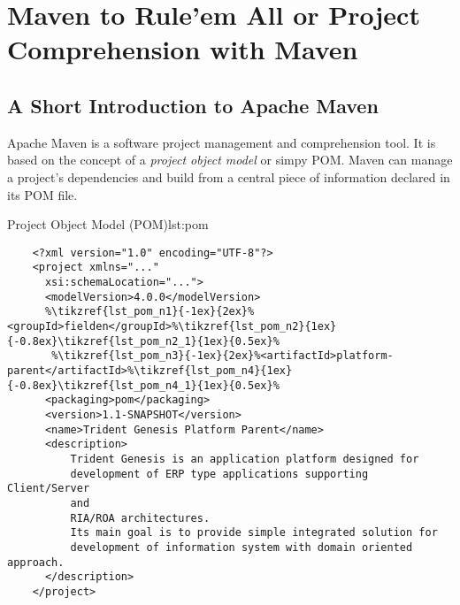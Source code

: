 \chapter{Maven to Rule'em All or Project Comprehension with Maven}\label{ch00:01}

\section{A Short Introduction to Apache Maven}
  
  Apache Maven is a software project management and comprehension tool. 
  It is based on the concept of a \emph{project object model} or simpy POM. 
  Maven can manage a project's dependencies and build from a central piece of information declared in its POM file.

  \begin{code}{Project Object Model (POM)}{lst:pom}
    \begin{lstlisting}
    <?xml version="1.0" encoding="UTF-8"?>
    <project xmlns="..."
	  xsi:schemaLocation="...">
	  <modelVersion>4.0.0</modelVersion>
	  %\tikzref{lst_pom_n1}{-1ex}{2ex}%<groupId>fielden</groupId>%\tikzref{lst_pom_n2}{1ex}{-0.8ex}\tikzref{lst_pom_n2_1}{1ex}{0.5ex}%
	   %\tikzref{lst_pom_n3}{-1ex}{2ex}%<artifactId>platform-parent</artifactId>%\tikzref{lst_pom_n4}{1ex}{-0.8ex}\tikzref{lst_pom_n4_1}{1ex}{0.5ex}%
	  <packaging>pom</packaging>
	  <version>1.1-SNAPSHOT</version>
	  <name>Trident Genesis Platform Parent</name>
	  <description>
		  Trident Genesis is an application platform designed for
		  development of ERP type applications supporting Client/Server
		  and
		  RIA/ROA architectures.
		  Its main goal is to provide simple integrated solution for 
		  development of information system with domain oriented approach. 
	  </description>
    </project> 
    \end{lstlisting}
  \end{code}


